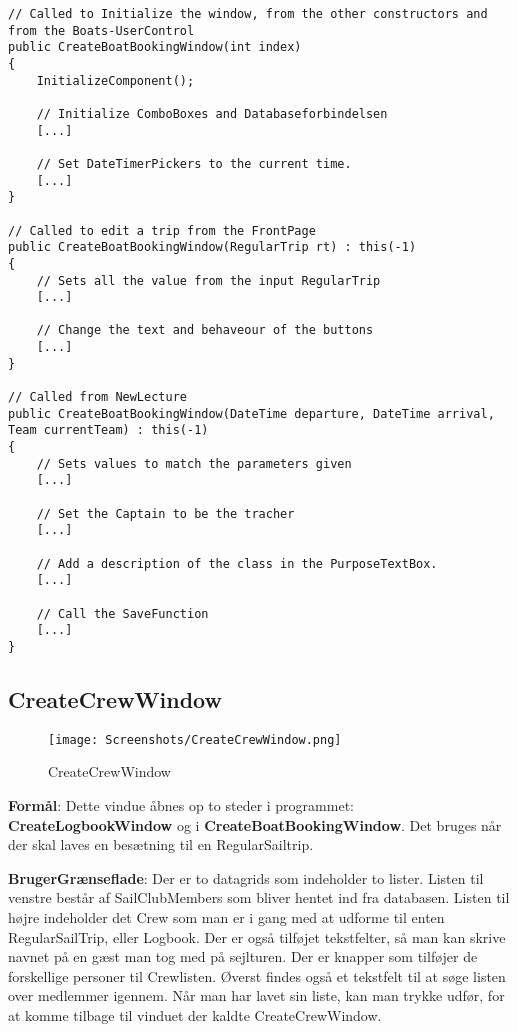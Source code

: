 \begin{lstlisting}[frame=single, caption=De tre constuctoreres forskrifter, label=threeConstructors]
// Called to Initialize the window, from the other constructors and from the Boats-UserControl
public CreateBoatBookingWindow(int index)
{
    InitializeComponent();

    // Initialize ComboBoxes and Databaseforbindelsen
    [...]

    // Set DateTimerPickers to the current time.
    [...]
}

// Called to edit a trip from the FrontPage
public CreateBoatBookingWindow(RegularTrip rt) : this(-1)
{
    // Sets all the value from the input RegularTrip
    [...]

    // Change the text and behaveour of the buttons
    [...]
}

// Called from NewLecture
public CreateBoatBookingWindow(DateTime departure, DateTime arrival, Team currentTeam) : this(-1)
{
    // Sets values to match the parameters given
    [...]

    // Set the Captain to be the tracher
    [...]

    // Add a description of the class in the PurposeTextBox.
    [...]

    // Call the SaveFunction
    [...]
}
\end{lstlisting}

\subsection{CreateCrewWindow}

\begin{wrapfigure}{r}{0.5\textwidth}
    \label{img:login_interface}
    \vspace{-20pt}
    \begin{center}
        \texttt{[image: Screenshots/CreateCrewWindow.png]}
    \end{center}
    \vspace{-20pt}
    \caption{CreateCrewWindow}
    \vspace{-30pt}
\end{wrapfigure}

\textbf{Formål}: Dette vindue åbnes op to steder i programmet: \textbf{CreateLogbookWindow} og i \textbf{CreateBoatBookingWindow}. Det bruges når der skal laves en besætning til en RegularSailtrip.  

\textbf{BrugerGrænseflade}: Der er to datagrids som indeholder to lister. Listen til venstre består af SailClubMembers som bliver hentet ind fra databasen. Listen til højre indeholder det Crew som man er i gang med at udforme til enten RegularSailTrip, eller Logbook. Der er også tilføjet tekstfelter, så man kan skrive navnet på en gæst man tog med på sejlturen. Der er knapper som tilføjer de forskellige personer til Crewlisten. Øverst findes også et tekstfelt til at søge listen over medlemmer igennem. Når man har lavet sin liste, kan man trykke udfør, for at komme tilbage til vinduet der kaldte CreateCrewWindow.

